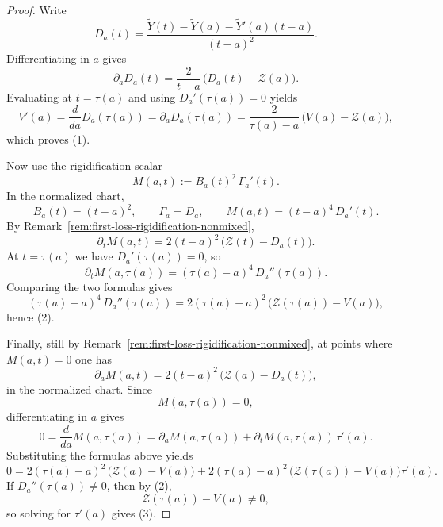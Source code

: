 \documentclass[11pt,a4paper]{amsart}
\theoremstyle{plain}
\theoremstyle{definition}
\begin{document}
\begin{proof}
Write
\[
D_a(t)
=
\frac{\widetilde Y(t)-\widetilde Y(a)-\widetilde Y'(a)(t-a)}{(t-a)^2}.
\]
Differentiating in $a$ gives
\[
\partial_a D_a(t)
=
\frac{2}{t-a}\,\bigl(D_a(t)-\mathcal Z(a)\bigr).
\]
Evaluating at $t=\tau(a)$ and using $D_a'(\tau(a))=0$ yields
\[
V'(a)
=
\frac{d}{da}D_a(\tau(a))
=
\partial_a D_a(\tau(a))
=
\frac{2}{\tau(a)-a}\,\bigl(V(a)-\mathcal Z(a)\bigr),
\]
which proves (1).

Now use the rigidification scalar
\[
M(a,t):=B_a(t)^2\,\Gamma_a'(t).
\]
In the normalized chart,
\[
B_a(t)=(t-a)^2,
\qquad
\Gamma_a=D_a,
\qquad
M(a,t)=(t-a)^4\,D_a'(t).
\]
By Remark~\ref{rem:first-loss-rigidification-nonmixed},
\[
\partial_t M(a,t)
=
2(t-a)^2\,\bigl(\mathcal Z(t)-D_a(t)\bigr).
\]
At $t=\tau(a)$ we have $D_a'(\tau(a))=0$, so
\[
\partial_t M(a,\tau(a))
=
(\tau(a)-a)^4\,D_a''(\tau(a)).
\]
Comparing the two formulas gives
\[
(\tau(a)-a)^4\,D_a''(\tau(a))
=
2(\tau(a)-a)^2\,\bigl(\mathcal Z(\tau(a))-V(a)\bigr),
\]
hence (2).

Finally, still by Remark~\ref{rem:first-loss-rigidification-nonmixed},
at points where $M(a,t)=0$ one has
\[
\partial_a M(a,t)
=
2(t-a)^2\,\bigl(\mathcal Z(a)-D_a(t)\bigr),
\]
in the normalized chart. Since
\[
M(a,\tau(a))=0,
\]
differentiating in $a$ gives
\[
0=\frac{d}{da}M(a,\tau(a))
=
\partial_a M(a,\tau(a))
+
\partial_t M(a,\tau(a))\,\tau'(a).
\]
Substituting the formulas above yields
\[
0
=
2(\tau(a)-a)^2\,\bigl(\mathcal Z(a)-V(a)\bigr)
+
2(\tau(a)-a)^2\,\bigl(\mathcal Z(\tau(a))-V(a)\bigr)\tau'(a).
\]
If $D_a''(\tau(a))\neq 0$, then by (2),
\[
\mathcal Z(\tau(a))-V(a)\neq 0,
\]
so solving for $\tau'(a)$ gives (3).
\end{proof}
\end{document}
